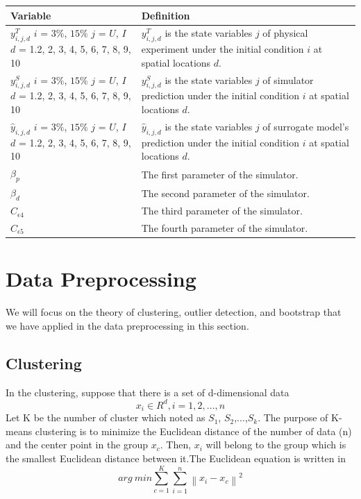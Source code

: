 \begin{minipage}{\linewidth}
	\label{tab:definition variables} 
	\renewcommand\arraystretch{1}
	\begin{tabular}{lp{}}
		\hline
		{\small Variable}     & {\small Definition}    \\
		\hline
		{\small $y_{i,j,d}^T$ $i$ = $3{\%}$, $15{\%}$ $j$ = $U$, $I$ $d$ = 1.2, 2, 3, 4, 5, 6, 7, 8, 9, 10}              &  
		$y_{i,j,d}^T$ is the state variables $j$ of physical experiment under the initial condition $i$ at spatial locations $d$.   \\
		{\small $y_{i,j,d}^S$ $i$ = $3{\%}$, $15{\%}$ $j$ = $U$, $I$ $d$ = 1.2, 2, 3, 4, 5, 6, 7, 8, 9, 10}              &  
		$y_{i,j,d}^S$ is the state variables $j$ of simulator prediction under the initial condition $i$ at spatial locations $d$.    \\
		{\small $\hat{y}_{i,j,d}$ $i$ = $3{\%}$, $15{\%}$ $j$ = $U$, $I$ $d$ = 1.2, 2, 3, 4, 5, 6, 7, 8, 9, 10}           & 
		$\hat{y}_{i,j,d}$ is the state variables $j$ of surrogate model's prediction under the initial condition $i$ at spatial locations $d$.\\
		{\small $\beta_{p}$} &
		The first parameter of the simulator.           \\
		{\small $\beta_{d}$}              &  
		The second parameter of the simulator.  \\
		{\small $C_{\epsilon4}$}              & 
		The third parameter of the simulator. \\
		{\small $C_{\epsilon5}$}              & 
		The fourth parameter of the simulator.  \\
		\hline
	\end{tabular}
\end{minipage}

\section{Data Preprocessing}

We will focus on the theory of clustering, outlier detection, and bootstrap that we have applied in the data preprocessing in this section.

\subsection{Clustering}
In the clustering, suppose that there is a set of d-dimensional data
\begin{equation}
x_{i}\in R^{d}, i=1,2,...,n
\end{equation}
Let K be the number of cluster which noted as {$S_{1}$, $S_{2}$,...,$S_{k}$}. The purpose of K-means clustering is to minimize the Euclidean distance of the number of data (n) and the center point in the group $x_{c}$. Then, $x_{i}$ will belong to the group which is the smallest Euclidean distance between it.The Euclidean equation is written in
\begin{equation}
arg\ min\sum_{c=1}^{K}\sum_{i=1}^{n}\left \| x_{i}- x_{c}\right \|^2
\end{equation}

